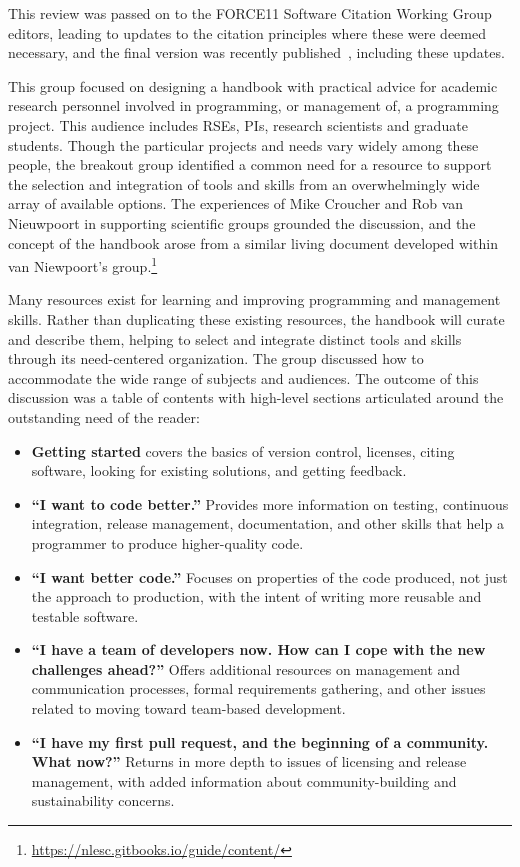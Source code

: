 \documentclass[a4paper,UKenglish]{dagrep}
\begin{document}
This review was passed on to the FORCE11 Software Citation Working Group editors, leading to updates to the citation principles where these were deemed necessary, and the final version was recently published~\cite{10.7717/peerj-cs.86}, including these updates.


This group focused on designing a handbook with practical advice for academic research personnel involved in programming, or management of, a programming project. This audience includes RSEs, PIs, research scientists and graduate students. Though the particular projects and needs vary widely among these people, the breakout group identified a common need for a resource to support the selection and integration of tools and skills from an overwhelmingly wide array of available options. The experiences of Mike Croucher and Rob van Nieuwpoort in supporting scientific groups grounded the discussion, and the concept of the handbook arose from a similar living document developed within van Niewpoort's group.\footnote{\url{https://nlesc.gitbooks.io/guide/content/}}

Many resources exist for learning and improving programming and management skills. Rather than duplicating these existing resources, the handbook will curate and describe them, helping to select and integrate distinct tools and skills through its need-centered organization. The group discussed how to accommodate the wide range of subjects and audiences. The outcome of this discussion was a table of contents with high-level sections articulated around the outstanding need of the reader:

\begin{itemize}
	\item \textbf{Getting started} covers the basics of version control, licenses, citing software, looking for existing solutions, and getting feedback.
	\item \textbf{``I want to code better.''} Provides more information on  testing, continuous integration, release management, documentation, and other skills that help a programmer to produce higher-quality code.
	\item \textbf{``I want better code.''} Focuses on properties of the code produced, not just the approach to production, with the intent of writing more reusable and testable software.
	\item \textbf{``I have a team of developers now. How can I cope with the new challenges ahead?''} Offers additional resources on management and communication processes, formal requirements gathering, and other issues related to moving toward team-based development.
	\item \textbf{``I have my first pull request, and the beginning of a community. What now?''} Returns in more depth to issues of licensing and release management, with added information about community-building and sustainability concerns.
\end{itemize}
\end{document}
